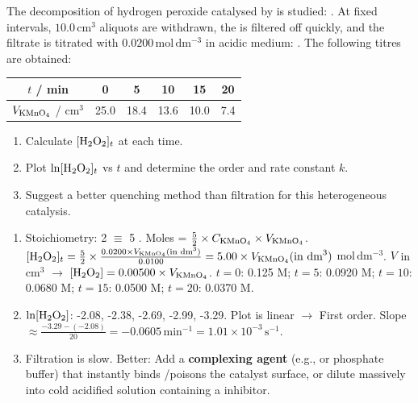 \documentclass[11pt]{article}
\begin{document}
\begin{exercice}
The decomposition of hydrogen peroxide catalysed by  is studied: .
At fixed intervals, $10.0\,\mathrm{cm}^3$ aliquots are withdrawn, the  is filtered off quickly, and the filtrate is titrated with $0.0200\,\mathrm{mol\,dm^{-3}}$  in acidic medium: .
The following titres are obtained:
\begin{center}
\begin{tabular}{|c|c|c|c|c|c|}\hline
$t$ / min & 0 & 5 & 10 & 15 & 20 \\ \hline
$V_{\ce{KMnO4}}$ / $\mathrm{cm}^3$ & 25.0 & 18.4 & 13.6 & 10.0 & 7.4 \\ \hline
\end{tabular}
\end{center}
\begin{enumerate}
    \item Calculate $[\ce{H2O2}]_t$ at each time.
    \item Plot $\ln[\ce{H2O2}]_t$ vs $t$ and determine the order and rate constant $k$.
    \item Suggest a better quenching method than filtration for this heterogeneous catalysis.
\end{enumerate}
\end{exercice}

\begin{corrige}[Exercise 2]
\begin{enumerate}
    \item Stoichiometry: 2  $\equiv$ 5 . Moles  = $\frac{5}{2} \times C_{\ce{KMnO4}} \times V_{\ce{KMnO4}}$.
    $[\ce{H2O2}]_t = \frac{5}{2} \times \frac{0.0200 \times V_{\ce{KMnO4}}(\text{in dm}^3)}{0.0100} = 5.00 \times V_{\ce{KMnO4}}(\text{in dm}^3)$ $\mathrm{mol\,dm^{-3}}$.
    $V$ in $\mathrm{cm}^3$ $\rightarrow$ $[\ce{H2O2}] = 0.00500 \times V_{\ce{KMnO4}}$.
    $t=0$: 0.125 M; $t=5$: 0.0920 M; $t=10$: 0.0680 M; $t=15$: 0.0500 M; $t=20$: 0.0370 M.
    \item $\ln[\ce{H2O2}]$: -2.08, -2.38, -2.69, -2.99, -3.29. Plot is linear $\rightarrow$ First order.
    Slope $\approx \frac{-3.29 - (-2.08)}{20} = -0.0605\,\mathrm{min^{-1}} = 1.01 \times 10^{-3}\,\mathrm{s^{-1}}$.
    \item Filtration is slow. Better: Add a \textbf{complexing agent} (e.g.,  or phosphate buffer) that instantly binds /poisons the catalyst surface, or dilute massively into cold acidified solution containing a  inhibitor.
\end{enumerate}
\end{corrige}
\end{document}
